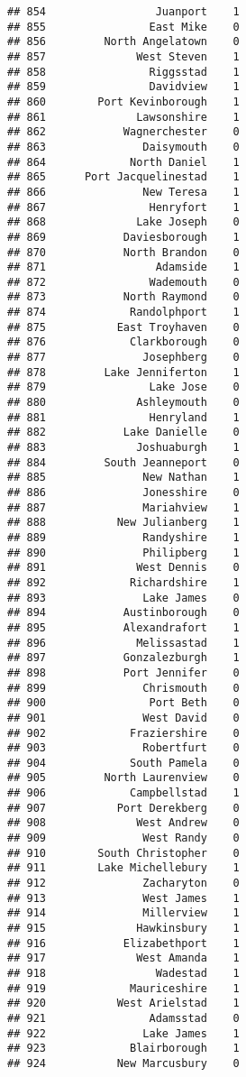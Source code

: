\documentclass[
]{article}
\begin{document}
\begin{verbatim}
## 854                 Juanport    1
## 855                East Mike    0
## 856         North Angelatown    0
## 857              West Steven    1
## 858                Riggsstad    1
## 859                Davidview    1
## 860        Port Kevinborough    1
## 861              Lawsonshire    1
## 862            Wagnerchester    0
## 863               Daisymouth    0
## 864             North Daniel    1
## 865      Port Jacquelinestad    1
## 866               New Teresa    1
## 867                Henryfort    1
## 868              Lake Joseph    0
## 869            Daviesborough    1
## 870            North Brandon    0
## 871                 Adamside    1
## 872                Wademouth    0
## 873            North Raymond    0
## 874             Randolphport    1
## 875           East Troyhaven    0
## 876             Clarkborough    0
## 877               Josephberg    0
## 878         Lake Jenniferton    1
## 879                Lake Jose    0
## 880              Ashleymouth    0
## 881                Henryland    1
## 882            Lake Danielle    0
## 883              Joshuaburgh    1
## 884         South Jeanneport    0
## 885               New Nathan    1
## 886               Jonesshire    0
## 887               Mariahview    1
## 888           New Julianberg    1
## 889               Randyshire    1
## 890               Philipberg    1
## 891              West Dennis    0
## 892             Richardshire    1
## 893               Lake James    0
## 894            Austinborough    0
## 895            Alexandrafort    1
## 896              Melissastad    1
## 897            Gonzalezburgh    1
## 898            Port Jennifer    0
## 899               Chrismouth    0
## 900                Port Beth    0
## 901               West David    0
## 902             Fraziershire    0
## 903               Robertfurt    0
## 904             South Pamela    0
## 905         North Laurenview    0
## 906             Campbellstad    1
## 907           Port Derekberg    0
## 908              West Andrew    0
## 909               West Randy    0
## 910        South Christopher    0
## 911        Lake Michellebury    1
## 912               Zacharyton    0
## 913               West James    1
## 914               Millerview    1
## 915              Hawkinsbury    1
## 916            Elizabethport    1
## 917              West Amanda    1
## 918                 Wadestad    1
## 919             Mauriceshire    1
## 920           West Arielstad    1
## 921                Adamsstad    0
## 922               Lake James    1
## 923             Blairborough    1
## 924           New Marcusbury    0

\end{verbatim}
\end{document}
